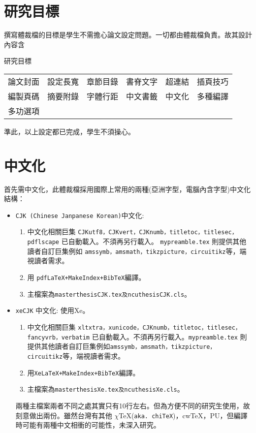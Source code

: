 \section{研究目標}
撰寫體裁檔的目標是學生不需擔心論文設定問題。一切都由體裁檔負責。故其設計內容含 \par
\begin{table}[!hbt]
\centering             {}
\caption{研究目標}
\end{table}
\begin{tabular}{cccccc}\\
論文封面 & 設定長寬 & 章節目錄 & 書脊文字 & 超連結 & 插頁技巧\\ 
編製頁碼 & 摘要附錄 & 字體行距 & 中文書籤 & 中文化 & 多種編譯  \\
多功選項 & \\
\end{tabular}

準此，以上設定都已完成，學生不須操心。
\section{中文化}
首先需中文化，此體裁檔採用國際上常用的兩種(亞洲字型，電腦內含字型)中文化結構：
\begin{itemize}
\item {\tt CJK (Chinese Janpanese Korean)}中文化: 
\begin{enumerate}
\item 中文化相關巨集 {\tt CJKutf8，CJKvert，CJKnumb，titletoc，titlesec，pdflscape} 已自動載入。不須再另行載入。\hfil\break
{\tt mypreamble.tex} 則提供其他讀者自訂巨集例如 {\tt amssymb，amsmath，tikzpicture，circuitikz}等，端視讀者需求。
\item 用 {\tt pdfLaTeX+MakeIndex+BibTeX}編譯。
\item 主檔案為{\tt masterthesis{\color{red}CJK}.tex及ncuthesis{\color{red}CJK}.cls}。
\end{enumerate}
\item {\tt xeCJK} 中文化: 使用Xe。
\begin{enumerate}
\item 中文化相關巨集 {\tt xltxtra，xunicode，CJKnumb，titletoc，titlesec，fancyvrb，verbatim} 已自動載入。不須再另行載入。{\tt mypreamble.tex} 則提供其他讀者自訂巨集例如{\tt amssymb，amsmath，tikzpicture， circuitikz}等，端視讀者需求。
\item 用{\tt XeLaTeX+MakeIndex+BibTeX}編譯。
\item 主檔案為{\tt masterthesis{\color{red}Xe}.tex及ncuthesis{\color{red}Xe}.cls}。
\end{enumerate}
兩種主檔案兩者不同之處其實只有10行左右。但為方便不同的研究生使用，故刻意做出兩份。雖然台灣有其他 $\chi$\TeX({\tt aka. chi\TeX})，cw\TeX，PU，但編譯時可能有兩種中文相衝的可能性，未深入研究。
\end{itemize}
